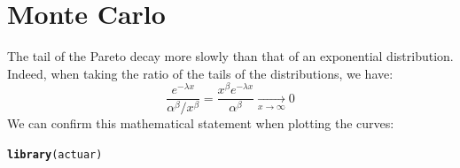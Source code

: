\documentclass[11pt]{article}\usepackage[]{graphicx}\usepackage[]{color}
\makeatletter
\newcommand{\hlstd}[1]{\textcolor[rgb]{0.345,0.345,0.345}{#1}}%
\newcommand{\hlkwd}[1]{\textcolor[rgb]{0.737,0.353,0.396}{\textbf{#1}}}%
\newenvironment{kframe}{%
 \def\at@end@of@kframe{}%
 \ifinner\ifhmode%
  \def\at@end@of@kframe{\end{minipage}}%
  \begin{minipage}{\columnwidth}%
 \fi\fi%
 \def\FrameCommand##1{\hskip\@totalleftmargin \hskip-\fboxsep
 \colorbox{shadecolor}{##1}\hskip-\fboxsep
     \hskip-\linewidth \hskip-\@totalleftmargin \hskip\columnwidth}%
 \MakeFramed {\advance\hsize-\width
   \@totalleftmargin\z@ \linewidth\hsize
   \@setminipage}}%
 {\par\unskip\endMakeFramed%
 \at@end@of@kframe}
\newenvironment{knitrout}{}{} %
\makeatother
\begin{document}
\section{Monte Carlo}
The tail of the Pareto decay more slowly than that of an exponential distribution. Indeed, when taking the ratio of the tails of the distributions, we have:
\begin{equation}
\frac{e^{-\lambda x}}{\alpha^{\beta}/x^{\beta}}=\frac{x^{\beta} e^{-\lambda x}}{ \alpha^{\beta}} \xrightarrow[x \to \infty]{}0
\end{equation}
We can confirm this mathematical statement when plotting the curves:
\begin{knitrout}
\color{fgcolor}\begin{kframe}
\begin{alltt}
\hlkwd{library}\hlstd{(actuar)}
\end{alltt}


{\ttfamily\noindent\itshape\color{messagecolor}{\#\# \\\#\# Attaching package: 'actuar'\\\#\# \\\#\# The following object is masked from 'package:grDevices':\\\#\# \\\#\#\ \ \ \  cm}}\end{kframe}
\end{knitrout}
\end{document}
